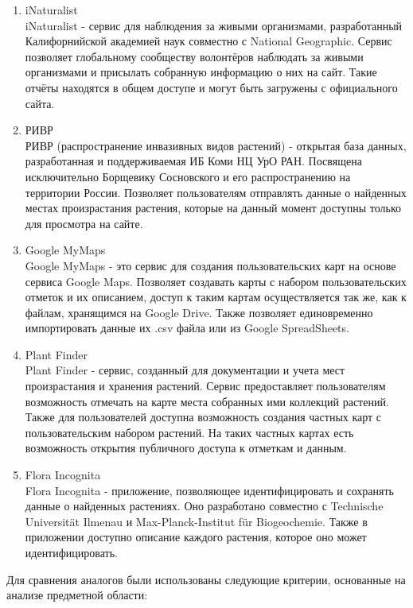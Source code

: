 \begin{enumerate}[topsep=0pt, parsep=0pt, itemsep=0pt, wide=0.5cm]
	\item iNaturalist \\
	iNaturalist\cite{inaturalist} - сервис для наблюдения за живыми организмами, разработанный Калифорнийской академией наук совместно с National Geographic.
	Сервис позволяет глобальному сообществу волонтёров наблюдать за живыми организмами и присылать собранную информацию о них на сайт.
	Такие отчёты находятся в общем доступе и могут быть загружены с официального сайта.
	\item РИВР \\
	РИВР\cite{rivr} (распространение инвазивных видов растений) - открытая база данных, разработанная и поддерживаемая ИБ Коми НЦ УрО РАН.
	Посвящена исключительно Борщевику Сосновского и его распространению на территории России.
	Позволяет пользователям отправлять данные о найденных местах произрастания растения, которые на данный момент доступны только для просмотра на сайте.
	\item Google MyMaps \\
	Google MyMaps\cite{googlemymaps} - это сервис для создания пользовательских карт на основе сервиса Google Maps.
	Позволяет создавать карты с набором пользовательских отметок и их описанием, доступ к таким картам осуществляется так же, как к файлам, хранящимся на Google Drive.
	Также позволяет единовременно импортировать данные их .csv файла или из Google SpreadSheets.
	\item Plant Finder \\
	Plant Finder\cite{plantfinder} - сервис, созданный для документации и
	учета мест произрастания и хранения растений. Сервис
	предоставляет пользователям возможность отмечать на
	карте места собранных ими коллекций растений. Также
	для пользователей доступна возможность создания
	частных карт с пользовательским набором растений. На
	таких частных картах есть возможность открытия
	публичного доступа к отметкам и данным.
	\item Flora Incognita \\
	Flora Incognita\cite{floraincognita} - приложение, позволяющее
	идентифицировать и сохранять данные о найденных
	растениях. Оно разработано совместно с Technische
	Universität Ilmenau и Max-Planck-Institut für Biogeochemie.
	Также в приложении доступно описание каждого
	растения, которое оно может идентифицировать.
\end{enumerate}

\nwln
Для сравнения аналогов были использованы следующие критерии, основанные на анализе предметной области:

